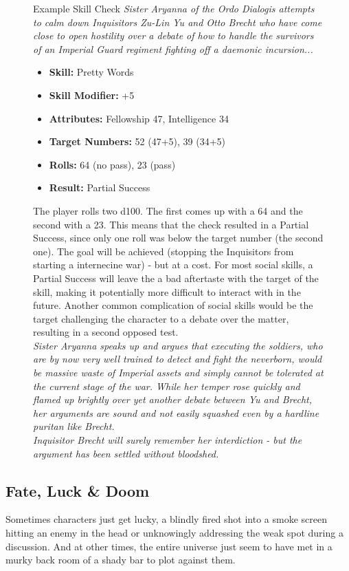\begin{figure}[ht]
	\begin{DndSidebar}{Example Skill Check}
	\textit{Sister Aryanna of the Ordo Dialogis attempts to calm down Inquisitors Zu-Lin Yu and Otto Brecht who have come close to open hostility over a debate of how to handle the survivors of an Imperial Guard regiment fighting off a daemonic incursion...}
	\begin{itemize}
		\item \textbf{Skill:} Pretty Words
		\item \textbf{Skill Modifier:} +5
		\item \textbf{Attributes:} Fellowship 47, Intelligence 34
		\item \textbf{Target Numbers:} 52 (47+5), 39 (34+5)
		\item \textbf{Rolls:} 64 (no pass), 23 (pass)
		\item \textbf{Result:} Partial Success
	\end{itemize}
	The player rolls two d100. The first comes up with a 64 and the second with a 23.
	This means that the check resulted in a Partial Success, since only one roll was below the target number (the second one).
	The goal will be achieved (stopping the Inquisitors from starting a internecine war) - but at a cost. For most social skills, a Partial Success will leave the a bad aftertaste with the target of the skill, making it potentially more difficult to interact with in the future. Another common complication of social skills would be the target challenging the character to a debate over the matter, resulting in a second opposed test. \\\noindent
	\textit{Sister Aryanna speaks up and argues that executing the soldiers, who are by now very well trained to detect and fight the neverborn, would be massive waste of Imperial assets and simply cannot be tolerated at the current stage of the war. While her temper rose quickly and flamed up brightly over yet another debate between Yu and Brecht, her arguments are sound and not easily squashed even by a hardline puritan like Brecht.\\\noindent
	Inquisitor Brecht will surely remember her interdiction - but the argument has been settled without bloodshed.}
	\end{DndSidebar}
\end{figure}

\subsection{Fate, Luck \& Doom}
Sometimes characters just get lucky, a blindly fired shot into a smoke screen hitting an enemy in the head or unknowingly addressing the weak spot during a discussion. And at other times, the entire universe just seem to have met in a murky back room of a shady bar to plot against them.

